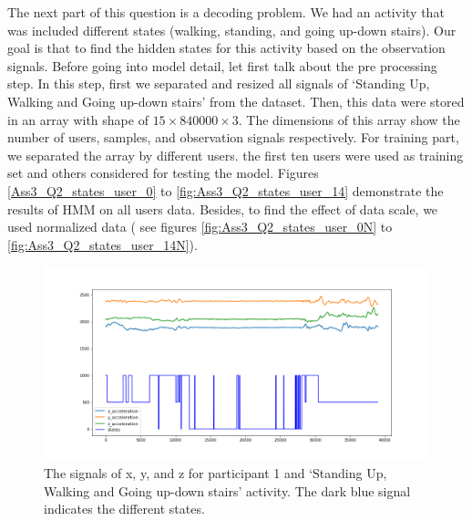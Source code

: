 The next part of this question is a decoding problem. We had an activity that was included different states (walking, standing, and going up-down stairs). Our goal is that to find the hidden states for this activity based on the observation signals.
Before going into model detail, let first talk about the pre processing step. In this step, first we separated and resized all signals of ‘Standing  Up,  Walking  and  Going  up-down  stairs’ from the dataset. Then, this data were stored in an array with shape of $15 \times 840000 \times 3$. The dimensions of this array show the number of users,  samples, and observation signals respectively.
For training part, we separated the array by different users. the first ten users were used as training set and others considered for testing the model. Figures \ref{Ass3_Q2_states_user_0} to \ref{fig:Ass3_Q2_states_user_14} demonstrate the results of HMM on all users data. Besides, to find the effect of data scale, we used normalized data ( see figures \ref{fig:Ass3_Q2_states_user_0N} to \ref{fig:Ass3_Q2_states_user_14N}).
\begin{figure}[H]
    \centering
    \begin{minipage}[b]{1\textwidth}
        \includegraphics[width=\textwidth]{manuscript/src/figures/Ass3/Ass3_Q2_states_user_0.png}
    \end{minipage}
    \caption{The signals of x, y, and z for participant 1 and ‘Standing  Up,  Walking  and  Going  up-down  stairs’ activity. The dark blue signal indicates the different states.}
    \label{fig:Ass3_Q2_states_user_0}
\end{figure}
